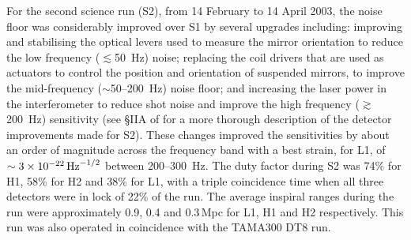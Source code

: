 \documentclass{article}
\begin{document}

For the second science run (S2), from 14 February to 14 April 2003, the noise
floor was considerably improved over S1 by several upgrades including: improving
and stabilising the optical levers used to measure the mirror orientation to
reduce the low frequency ($\lesssim$50~Hz) noise; replacing the coil drivers
that are used as actuators to control the position and orientation of suspended
mirrors, to improve the mid-frequency ($\sim$50--200~Hz) noise floor; and
increasing the laser power in the interferometer to reduce shot noise and
improve the high frequency ($\gtrsim$200~Hz) sensitivity (see \S{}IIA of
\cite{Abbott:2005a} for a more thorough description of the detector improvements
made for S2). These changes improved the sensitivities by about an order of
magnitude across the frequency band with a best strain, for L1, of
$\sim3\times10^{-22}\,{\rm Hz}^{-1/2}$ between 200--300~Hz. The duty factor
during S2 was 74\% for H1, 58\% for H2 and 38\% for L1, with a triple
coincidence time when all three detectors were in lock of 22\% of the run. The
average inspiral ranges during the run were approximately 0.9, 0.4 and 0.3\,Mpc
for L1, H1 and H2 respectively. This run was also operated in coincidence with
the TAMA300 DT8 run.
\end{document}
